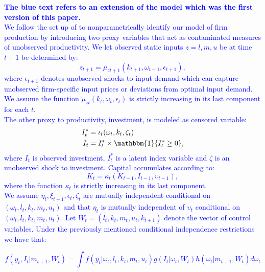\documentclass{article}
\begin{document}
\textcolor{blue}{\textbf{The blue text refers to an extension of the model which was the first version of this paper.}}\\

\textcolor{blue}{We follow the set up of \cite{Hu2019} to nonparametrically identify our model of firm production by introducing two proxy variables that act as contaminated measures of unobserved productivity. We let observed static inputs $z=l,m,u$ be at time $t+1$ be determined by:
\begin{equation}\label{static+1}
    z_{t+1}=\mu_{zt+1}(k_{t+1},\omega_{t+1}, \epsilon_{t+1}),
\end{equation}
where $\epsilon_{t+1}$ denotes unobserved shocks to input demand which can capture unobserved firm-specific input prices or deviations from optimal input demand. We assume the function $\mu_{zt}(k_{t},\omega_{t}, \epsilon_{t})$ is strictly increasing in its last component for each $t$}.\\

\textcolor{blue}{The other proxy to productivity, investment, is modeled as censored variable:
\begin{equation}\label{investment}
    \begin{split}
    I_{t}^{*}&=\iota_{t}(\omega_{t}, k_{t}, \zeta_{t})\\
    I_{t}&=I_{t}^{*}\times  \mathbbm{1}\{I_{t}^{*}\geq 0\},
    \end{split}
\end{equation}
where $I_{t}$ is observed investment, $I_{t}^{*}$ is a latent index variable and $\zeta$ is an unobserved shock to investment. Capital accumulates according to:
\begin{equation}\label{capitalhu}
    K_{t}=\kappa_{t}(K_{t-1}, I_{t-1}, \upsilon_{t-1}),
\end{equation}
where the function $\kappa_{t}$ is strictly increasing in its last component.}\\

\textcolor{blue}{We assume $\eta_{t}, \xi_{t+1}, \epsilon_{t}, \zeta_{t}$ are mutually independent conditional on $(\omega_{t}, l_{t}, k_{t}, m_{t}, u_{t})$ and that $\eta_{t}$ is mutually independent of $\upsilon_{t}$ conditional on $(\omega_{t}, l_{t}, k_{t}, m_{t}, u_{t})$. Let $W_{t}=(l_{t}, k_{t}, m_{t}, u_{t}, k_{t+1})$ denote the vector of control variables. Under the previously mentioned conditional independence restrictions we have that:}

\textcolor{blue}{
\begin{equation}\label{identification}
    f(y_{t}, I_{t}|m_{t+1}, W_{t})=\int f(y_{t}|\omega_{t}, l_{t}, k_{t}, m_{t}, u_{t})g(I_{t}|\omega_{t}, W_{t})h(\omega_{t}|m_{t+1}, W_{t})d\omega_{t}
\end{equation}
}
\end{document}
